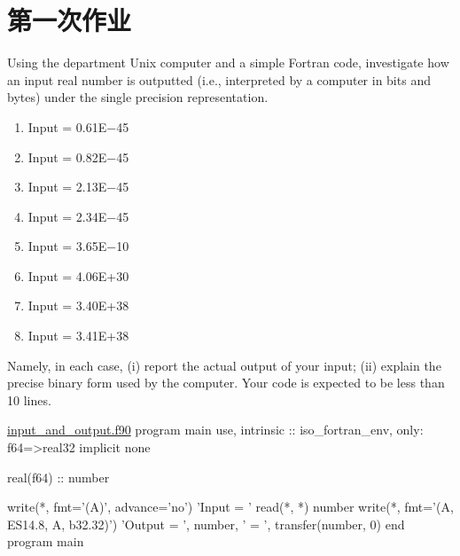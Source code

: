 \section{第一次作业}

\begin{homework}[label={H:1-1}]
    Using the department Unix computer and a simple Fortran code, investigate how an input real number is outputted (i.e., interpreted by a computer in bits and bytes) under the single precision representation.

    \begin{enumerate}[label=(\alph*)]
        \item Input = 0.61E−45
        \item Input = 0.82E−45
        \item Input = 2.13E−45
        \item Input = 2.34E−45
        \item Input = 3.65E−10
        \item Input = 4.06E+30
        \item Input = 3.40E+38
        \item Input = 3.41E+38
    \end{enumerate}

    Namely, in each case, (i) report the actual output of your input; (ii) explain the precise binary form used by the computer. Your code is expected to be less than 10 lines.
\end{homework}

\begin{fortran}{\href{https://github.com/iydon/CFDRust/blob/main/mae5005/homework/1/input_and_output.f90}{input\_and\_output.f90}}
program main
   use, intrinsic :: iso_fortran_env, only: f64=>real32
   implicit none

   real(f64) :: number

   write(*, fmt='(A)', advance='no') 'Input  = '
   read(*, *) number
   write(*, fmt='(A, ES14.8, A, b32.32)') 'Output = ', number, ' = ', transfer(number, 0)
end program main
\end{fortran}



